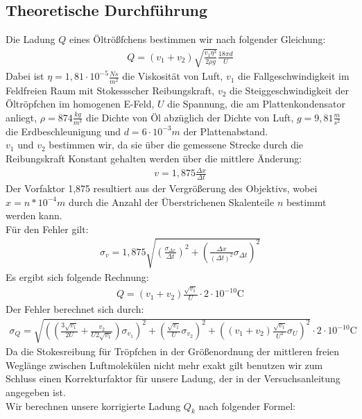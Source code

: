 \documentclass[12pt]{scrartcl}
\begin{document}
\subsection{Theoretische Durchführung}
Die Ladung $Q$ eines Öltrößfchens bestimmen wir nach folgender Gleichung:
\begin{align}
Q = (v_1+v_2)\sqrt{\frac{v_1 \eta^3}{2\rho g}} \frac{18 \pi d}{U}
\end{align}
Dabei ist $\eta = 1,81\cdot10^{-5}\frac{Ns}{m^2}$ die Viskosität von Luft, $v_1$ die Fallgeschwindigkeit im Feldfreien Raum mit Stokessscher Reibungskraft, $v_2$ die Steiggeschwindigkeit der Öltröpfchen im homogenen E-Feld, $U$ die Spannung, die am Plattenkondensator anliegt, $\rho = 874 \frac{kg}{m^3}$ die Dichte von Öl abzüglich der Dichte von Luft, $g = 9,81 \frac{m}{s^2}$ die Erdbeschleunigung und $ d = 6\cdot10^{-3} m$ der Plattenabstand.\\
$v_1$ und $v_2$ bestimmen wir, da sie über die gemessene Strecke durch die Reibungskraft Konstant gehalten werden über die mittlere Änderung:
\begin{align}
v = 1,875\frac{\Delta x}{\Delta t}
\end{align}
Der Vorfaktor 1,875 resultiert aus der Vergrößerung des Objektivs, wobei $x = n*10^{-4}m$ durch die Anzahl der Überstrichenen Skalenteile $n$ bestimmt werden kann.\\
Für den Fehler gilt:
\begin{align}
\sigma_v = 1,875 \sqrt{
\left(\frac{\sigma_{\Delta x}}{\Delta t}\right)^2+
\left(\frac{\Delta x}{(\Delta t)^2}\sigma_{\Delta t}\right)^2}
\end{align}
Es ergibt sich folgende Rechnung:
\begin{align}
Q = (v_1+v_2)\frac{\sqrt{v_1}}{U}\cdot2\cdot10^{-10} \text{C}
\end{align}
Der Fehler berechnet sich durch:
\begin{align}
\sigma_Q = \sqrt{
\left(\left(\frac{3 \sqrt{v_1}}{2 U} + \frac{v_2}{U2\sqrt{v_1}}
\right)\sigma_{v_1}\right)^2+
\left(\frac{\sqrt{v_1}}{U}\sigma_{v_2}\right)^2+
\left((v_1+v_2)\frac{\sqrt{v_1}}{U^2}\sigma_{U}\right)^2}
\cdot2\cdot10^{-10}\text{C}
\end{align}
Da die Stokesreibung für Tröpfchen in der Größenordnung der mittleren freien Weglänge zwischen Luftmolekülen nicht mehr exakt gilt benutzen wir zum Schluss einen Korrekturfaktor für unsere Ladung, der in der Versuchsanleitung angegeben ist.\\
Wir berechnen unsere korrigierte Ladung $Q_k$ nach folgender Formel:
\end{document}
